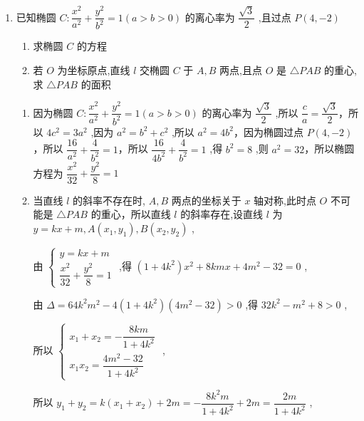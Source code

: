 \begin{enumerate}
    \item 已知椭圆 $C : \dfrac{{x}^{2}}{{a}^{2}} + \dfrac{{y}^{2}}{{b}^{2}} = 1\left( {a > b > 0}\right)$ 的离心率为 $\dfrac{\sqrt{3}}{2}$ ,且过点 $P\left( {4, - 2}\right)$ 
    \begin{enumerate}
        \item 求椭圆 $C$ 的方程
        \item 若 $O$ 为坐标原点,直线 $l$ 交椭圆 $C$ 于 $A,B$ 两点,且点 $O$ 是 $\bigtriangleup  {PAB}$ 的重心,求 $\bigtriangleup  {PAB}$ 的面积
    \end{enumerate}
    \begin{jieda}
        \begin{enumerate}
            \item 因为椭圆 $C : \dfrac{{x}^{2}}{{a}^{2}} + \dfrac{{y}^{2}}{{b}^{2}} = 1\left( {a > b > 0}\right)$ 的离心率为 $\dfrac{\sqrt{3}}{2}$ ,所以 $\dfrac{c}{a} = \dfrac{\sqrt{3}}{2}$，所以 $4{c}^{2} = 3{a}^{2}$ ,因为 ${a}^{2} = {b}^{2} + {c}^{2}$ ,所以 ${a}^{2} = 4{b}^{2}$，因为椭圆过点 $P\left( {4, - 2}\right)$，所以 $\dfrac{16}{{a}^{2}} + \dfrac{4}{{b}^{2}} = 1$，所以 $\dfrac{16}{4{b}^{2}} + \dfrac{4}{{b}^{2}} = 1$ ,得 ${b}^{2} = 8$ ,则 ${a}^{2} = {32}$，所以椭圆方程为 $\dfrac{{x}^{2}}{32} + \dfrac{{y}^{2}}{8} = 1$
            \item 当直线 $l$ 的斜率不存在时, $A,B$ 两点的坐标关于 $x$ 轴对称,此时点 $O$ 不可能是 $\bigtriangleup  {PAB}$ 的重心，所以直线 $l$ 的斜率存在,设直线 $l$ 为 $y = {kx} + m,A\left( {{x}_{1},{y}_{1}}\right) ,B\left( {{x}_{2},{y}_{2}}\right)$ ,
        
        由 $\left\{  \begin{array}{l} y = {kx} + m \\  \dfrac{{x}^{2}}{32} + \dfrac{{y}^{2}}{8} = 1 \end{array}\right.$ ,得 $\left( {1 + 4{k}^{2}}\right) {x}^{2} + {8kmx} + 4{m}^{2} - {32} = 0$ ,
        
        由 $\Delta  = {64}{k}^{2}{m}^{2} - 4\left( {1 + 4{k}^{2}}\right) \left( {4{m}^{2} - {32}}\right)  > 0$ ,得 ${32}{k}^{2} - {m}^{2} + 8 > 0$ ,
        
        所以 $\left\{  \begin{array}{l} {x}_{1} + {x}_{2} =  - \dfrac{8km}{1 + 4{k}^{2}} \\  {x}_{1}{x}_{2} = \dfrac{4{m}^{2} - {32}}{1 + 4{k}^{2}} \end{array}\right.$ ,
        
        所以 ${y}_{1} + {y}_{2} = k\left( {{x}_{1} + {x}_{2}}\right)  + {2m} =  - \dfrac{8{k}^{2}m}{1 + 4{k}^{2}} + {2m} = \dfrac{2m}{1 + 4{k}^{2}}$ ,
        

\end{enumerate}
\end{jieda}
\end{enumerate}
